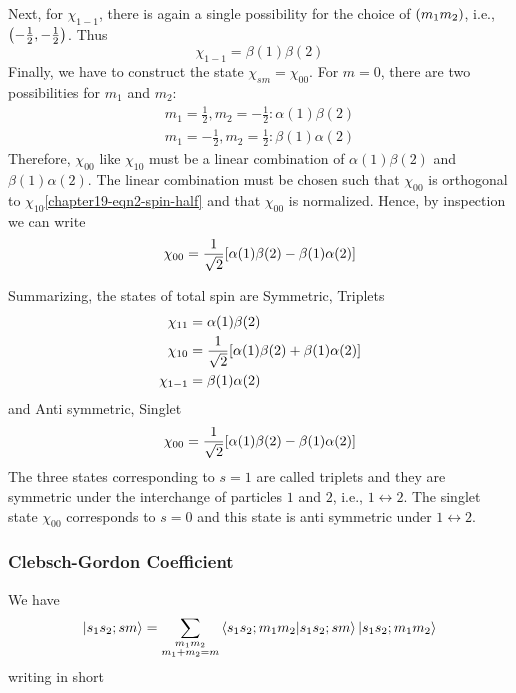 Next, for $\chi_{1-1}$, there is again a single possibility for the choice of $\qty(m_1 m_2)$, i.e., $\qty(-\frac{1}{2}, -\frac{1}{2})$. Thus
\begin{equation}
\label{chapter19-eqn3-spin-half}
\chi_{1-1} = \beta(1) \beta(2)
\end{equation}
Finally, we have to construct the state $\chi_{s m} = \chi_{0 0}$. For $m=0$, there are two possibilities for $m_1$ and $m_2$:
\begin{align*}
m_1 = \frac{1}{2}, m_2 = -\frac{1}{2} : \alpha(1)\beta(2) \\
m_1 = -\frac{1}{2}, m_2 = \frac{1}{2} : \beta(1)\alpha(2)
\end{align*}
Therefore, $\chi_{0 0}$ like $\chi_{1 0}$ must be a linear combination of $\alpha(1)\beta(2)$ and $\beta(1)\alpha(2)$. The linear combination must be chosen such that $\chi_{0 0}$ is orthogonal to $\chi_{1 0}$\ref{chapter19-eqn2-spin-half} and that $\chi_{0 0}$ is normalized. Hence, by inspection we can write
\begin{equation}
\label{chapter19-eqn4-spin-half}
\chi_{0 0} = \frac{1}{\sqrt{2}} \qty[\alpha(1) \beta(2) - \beta(1) \alpha(2)]
\end{equation}

Summarizing, the states of total spin are Symmetric, Triplets
\begin{align*}
\chi_{1 1} &= \alpha(1) \beta(2)\\
\chi_{1 0} &= \frac{1}{\sqrt{2}}\qty[\alpha(1) \beta(2) + \beta(1) \alpha(2)]\\
\chi_{1 -1} &= \beta(1) \alpha(2)
\end{align*}
and Anti symmetric, Singlet
\begin{equation*}
\chi_{0 0} = \frac{1}{\sqrt{2}}\qty[\alpha(1) \beta(2) - \beta(1) \alpha(2)]
\end{equation*}
The three states corresponding to $s=1$ are called triplets and they are symmetric under the interchange of particles $1$ and $2$, i.e., $1 \leftrightarrow 2$. The singlet state $\chi_{0 0}$ corresponds to $s=0$ and this state is anti symmetric under $1 \leftrightarrow 2$.



\subsubsection{Clebsch-Gordon Coefficient}
We have
\begin{equation}
\ket{s_1 s_2; s m} = \sum_{\substack{m_1 m_2 \\ m_1 + m_2 = m}} \braket{s_1 s_2; m_1 m_2}{s_1 s_2; s m} \ket{s_1 s_2; m_1 m_2}
\end{equation}
writing in short

